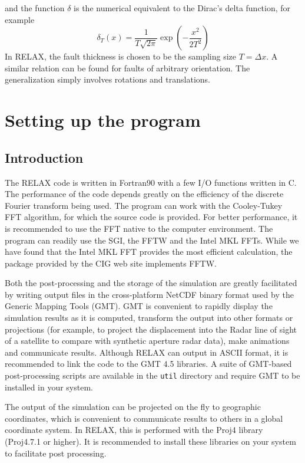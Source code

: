 \documentclass[10pt]{article}
\begin{document}
and the function $\delta$ is the numerical equivalent to the Dirac's delta function, for example
\begin{equation}
\delta_T(x)=\frac{1}{T\sqrt{2\pi}}\exp\!\left(-\frac{x^2}{2T^2}\right)
\end{equation}
In RELAX, the fault thickness is chosen to be the sampling size $T=\Delta x$. A similar relation can be found for faults of arbitrary orientation. The generalization simply involves rotations and translations. 

\pagebreak
\section{Setting up the program}

\subsection{Introduction}
The RELAX code is written in Fortran90 with a few I/O functions written in C. The performance of the code depends greatly on the efficiency of the discrete Fourier transform being used. The program can work with the Cooley-Tukey FFT algorithm, for which the source code is provided. For better performance, it is recommended to use the FFT native to the computer environment. The program can readily use the SGI, the FFTW and the Intel MKL FFTs. While we have found that the Intel MKL FFT provides the most efficient calculation, the package provided by the CIG web site implements FFTW.

Both the post-processing and the storage of the simulation are greatly facilitated by writing output files in the cross-platform NetCDF binary format used by the Generic Mapping Tools (GMT). GMT is convenient to rapidly display the simulation results as it is computed, transform the output into other formats or projections (for example, to project the displacement into the Radar line of sight of a satellite to compare with synthetic aperture radar data), make animations and communicate results. Although RELAX can output in ASCII format, it is recommended to link the code to the GMT 4.5 libraries. A suite of GMT-based post-processing scripts are available in the \verb`util` directory and require GMT to be installed in your system.

The output of the simulation can be projected on the fly to geographic coordinates, which is convenient to communicate results to others in a global coordinate system. In RELAX, this is performed with the Proj4 library (Proj4.7.1 or higher). It is recommended to install these libraries on your system to facilitate post processing.
\end{document}

